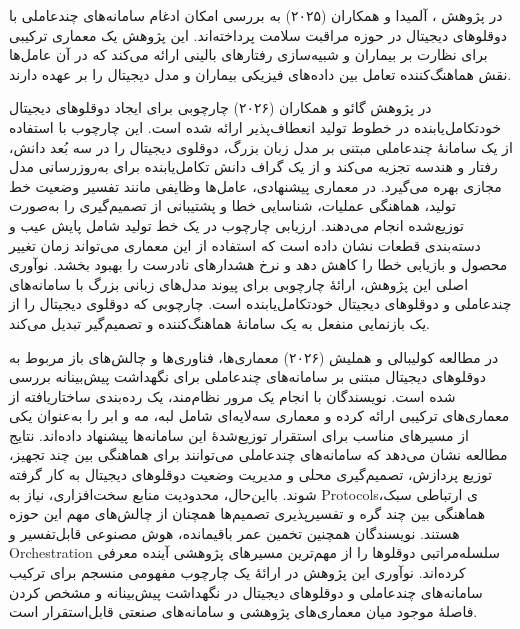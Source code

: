 در پژوهش \cite{almeida2025healthagentsdt}، 
آلمیدا و همکاران (۲۰۲۵)
 به بررسی امکان ادغام سامانه‌های چندعاملی با دوقلوهای دیجیتال در حوزه مراقبت سلامت پرداخته‌اند. این پژوهش یک معماری ترکیبی برای نظارت بر بیماران و شبیه‌سازی رفتارهای بالینی ارائه می‌کند که در آن عامل‌ها نقش هماهنگ‌کننده تعامل بین داده‌های فیزیکی بیماران و مدل دیجیتال را بر عهده دارند. 


در پژوهش
گائو و همکاران (۲۰۲۶)
\cite{gao2026selfevolving}
چارچوبی برای ایجاد دوقلوهای دیجیتال خودتکامل‌یابنده در خطوط تولید انعطاف‌پذیر ارائه شده است. این چارچوب با استفاده از یک سامانهٔ چندعاملی مبتنی بر مدل زبان بزرگ، دوقلوی دیجیتال را در سه بُعد دانش، رفتار و هندسه تجزیه می‌کند و از یک گراف دانش تکامل‌یابنده برای به‌روزرسانی مدل مجازی بهره می‌گیرد. در معماری پیشنهادی، عامل‌ها وظایفی مانند تفسیر وضعیت خط تولید، هماهنگی عملیات، شناسایی خطا و پشتیبانی از تصمیم‌گیری را به‌صورت توزیع‌شده انجام می‌دهند. ارزیابی چارچوب در یک خط تولید شامل پایش عیب و دسته‌بندی قطعات نشان داده است که استفاده از این معماری می‌تواند زمان تغییر محصول و بازیابی خطا را کاهش دهد و نرخ هشدارهای نادرست را بهبود بخشد. نوآوری اصلی این پژوهش، ارائهٔ چارچوبی برای پیوند مدل‌های زبانی بزرگ با سامانه‌های چندعاملی و دوقلوهای دیجیتال خودتکامل‌یابنده است. چارچوبی که دوقلوی دیجیتال را از یک بازنمایی منفعل به یک سامانهٔ هماهنگ‌کننده و تصمیم‌گیر تبدیل می‌کند.



در مطالعه
کولیبالی و هملیش (۲۰۲۶)
\cite{coulibaly2026madtdt}
معماری‌ها، فناوری‌ها و چالش‌های باز مربوط به دوقلوهای دیجیتال مبتنی بر سامانه‌های چندعاملی برای نگهداشت پیش‌بینانه بررسی شده است. نویسندگان با انجام یک مرور نظام‌مند، یک رده‌بندی ساختاریافته از معماری‌های ترکیبی
ارائه کرده و معماری سه‌لایه‌ای شامل لبه، مه و ابر را به‌عنوان یکی از مسیرهای مناسب برای استقرار توزیع‌شدهٔ این سامانه‌ها پیشنهاد داده‌اند. نتایج مطالعه نشان می‌دهد که سامانه‌های چندعاملی می‌توانند برای هماهنگی بین چند تجهیز، توزیع پردازش، تصمیم‌گیری محلی و مدیریت وضعیت دوقلوهای دیجیتال به کار گرفته شوند. بااین‌حال، محدودیت منابع سخت‌افزاری، نیاز به \glspl{Protocol}ی ارتباطی سبک، هماهنگی بین چند گره و تفسیرپذیری تصمیم‌ها همچنان از چالش‌های مهم این حوزه هستند. نویسندگان همچنین تخمین عمر باقیمانده، هوش مصنوعی قابل‌تفسیر و \gls{Orchestration} سلسله‌مراتبی دوقلوها را از مهم‌ترین مسیرهای پژوهشی آینده معرفی کرده‌اند. نوآوری این پژوهش در ارائهٔ یک چارچوب مفهومی منسجم برای ترکیب سامانه‌های چندعاملی و دوقلوهای دیجیتال در نگهداشت پیش‌بینانه و مشخص کردن فاصلهٔ موجود میان معماری‌های پژوهشی و سامانه‌های صنعتی قابل‌استقرار است.









